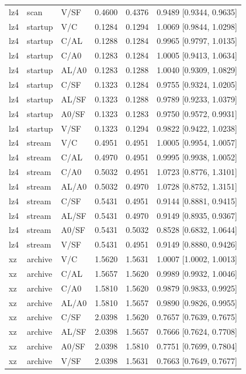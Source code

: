 \begin{longtable}{lllrrl}
lz4 & scan & V/SF & 0.4600 & 0.4376 & 0.9489 [0.9344, 0.9635] \\
lz4 & startup & V/C & 0.1284 & 0.1294 & 1.0069 [0.9844, 1.0298] \\
lz4 & startup & C/AL & 0.1288 & 0.1284 & 0.9965 [0.9797, 1.0135] \\
lz4 & startup & C/A0 & 0.1283 & 0.1284 & 1.0005 [0.9413, 1.0634] \\
lz4 & startup & AL/A0 & 0.1283 & 0.1288 & 1.0040 [0.9309, 1.0829] \\
lz4 & startup & C/SF & 0.1323 & 0.1284 & 0.9755 [0.9324, 1.0205] \\
lz4 & startup & AL/SF & 0.1323 & 0.1288 & 0.9789 [0.9233, 1.0379] \\
lz4 & startup & A0/SF & 0.1323 & 0.1283 & 0.9750 [0.9572, 0.9931] \\
lz4 & startup & V/SF & 0.1323 & 0.1294 & 0.9822 [0.9422, 1.0238] \\
lz4 & stream & V/C & 0.4951 & 0.4951 & 1.0005 [0.9954, 1.0057] \\
lz4 & stream & C/AL & 0.4970 & 0.4951 & 0.9995 [0.9938, 1.0052] \\
lz4 & stream & C/A0 & 0.5032 & 0.4951 & 1.0723 [0.8776, 1.3101] \\
lz4 & stream & AL/A0 & 0.5032 & 0.4970 & 1.0728 [0.8752, 1.3151] \\
lz4 & stream & C/SF & 0.5431 & 0.4951 & 0.9144 [0.8881, 0.9415] \\
lz4 & stream & AL/SF & 0.5431 & 0.4970 & 0.9149 [0.8935, 0.9367] \\
lz4 & stream & A0/SF & 0.5431 & 0.5032 & 0.8528 [0.6832, 1.0644] \\
lz4 & stream & V/SF & 0.5431 & 0.4951 & 0.9149 [0.8880, 0.9426] \\
xz & archive & V/C & 1.5620 & 1.5631 & 1.0007 [1.0002, 1.0013] \\
xz & archive & C/AL & 1.5657 & 1.5620 & 0.9989 [0.9932, 1.0046] \\
xz & archive & C/A0 & 1.5810 & 1.5620 & 0.9879 [0.9833, 0.9925] \\
xz & archive & AL/A0 & 1.5810 & 1.5657 & 0.9890 [0.9826, 0.9955] \\
xz & archive & C/SF & 2.0398 & 1.5620 & 0.7657 [0.7639, 0.7675] \\
xz & archive & AL/SF & 2.0398 & 1.5657 & 0.7666 [0.7624, 0.7708] \\
xz & archive & A0/SF & 2.0398 & 1.5810 & 0.7751 [0.7699, 0.7804] \\
xz & archive & V/SF & 2.0398 & 1.5631 & 0.7663 [0.7649, 0.7677] \\

\end{longtable}

